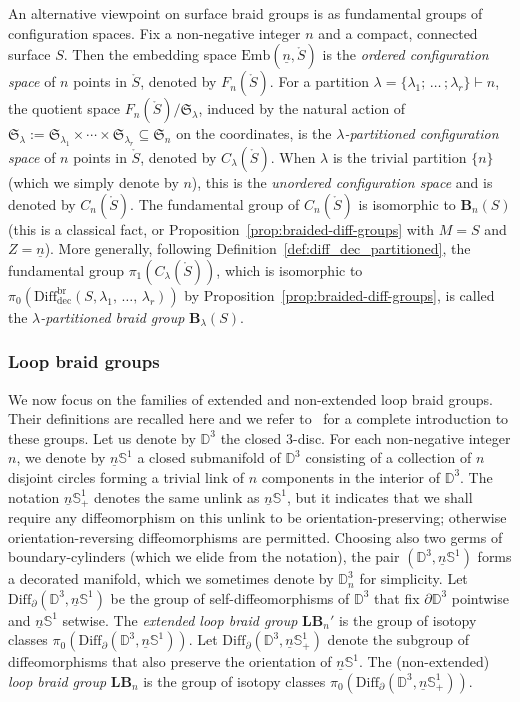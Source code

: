 \documentclass[AHL,Unicode,published]{cedram}
\newcommand{\Emb}{\mathrm{Emb}}
\newcommand{\Diff}{\mathrm{Diff}}
\newcommand{\Int}{\mathring}
\newcommand{\rdec}{\mathrm{dec}}
\newcommand{\B}{\ensuremath{\mathbf{B}}}
\newcommand{\lB}{\mathbf{LB}}
\newcommand{\Sym}{\mathfrak{S}}
\newcommand{\bD}{\mathbb{D}}
\newcommand{\bS}{\mathbb{S}}
\newcommand{\diffdecbr}{\ensuremath{\mathrm{Diff}_{\rdec}^{\mathrm{br}}}}
\begin{document}
An alternative viewpoint on surface braid groups is as fundamental groups of configuration spaces. Fix a non-negative integer $n$ and a compact, connected surface $S$. Then the embedding space $\Emb(\underline{n},\Int{S})$ is the \emph{ordered configuration space} of $n$ points in $\Int{S}$, denoted by $F_n(\Int{S})$. For a partition $\lambda = \boldsymbol{\{} \lambda_{1};\,\ldots\,;\lambda_{r} \boldsymbol{\}} \vdash n$, the quotient space $F_n(\Int{S})/{\Sym_{\lambda}}$, induced by the natural action of $\Sym_{\lambda}:= \Sym_{\lambda_{1}} \times \cdots \times \Sym_{\lambda_{r}} \subseteq \Sym_n$ on the coordinates, is the \emph{$\lambda$-partitioned configuration space} of $n$ points in $\Int{S}$, denoted by $C_{\lambda}(\Int{S})$. When $\lambda$ is the trivial partition $\boldsymbol{\{} n \boldsymbol{\}}$ (which we simply denote by $n$), this is the \emph{unordered configuration space} and is denoted by $C_n(\Int{S})$. The fundamental group of $C_n(\Int{S})$ is isomorphic to $\B_n(S)$ (this is a classical fact, or Proposition~\ref{prop:braided-diff-groups} with $M=S$ and $Z=\underline{n}$). More generally, following Definition~\ref{def:diff_dec_partitioned}, the fundamental group $\pi_{1}(C_\lambda(\Int{S}))$, which is isomorphic to $\pi_{0}(\diffdecbr(S,\lambda_{1},\,\dots,\,\lambda_{r}))$ by Proposition~\ref{prop:braided-diff-groups}, is called the \emph{$\lambda$-partitioned braid group} $\B_{\lambda}(S)$.


\subsubsection{Loop braid groups}\label{sss:category_loop_braid_groups}

We now focus on the families of extended and non-extended loop braid groups. Their definitions are recalled here and we refer to~\cite{Damianijourney} for a complete introduction to these groups. Let us denote by $\bD^{3}$ the closed $3$-disc. For each non-negative integer $n$, we denote by $\underline{n}\bS^{1}$ a closed submanifold of $\bD^{3}$ consisting of a collection of $n$ disjoint circles forming a trivial link of $n$ components in the interior of $\bD^{3}$. The notation $\underline{n}\bS_{+}^{1}$ denotes the same unlink as $\underline{n}\bS^{1}$, but it indicates that we shall require any diffeomorphism on this unlink to be orientation-preserving; otherwise orientation-reversing diffeomorphisms are permitted. Choosing also two germs of boundary-cylinders (which we elide from the notation), the pair $(\ensuremath{\bD^{3}},\underline{n}\bS^{1})$ forms a decorated manifold, which we sometimes denote by $\bD^{3}_{n}$ for simplicity. Let $\Diff_{\partial}(\bD^{3},\underline{n}\bS^{1})$ be the group of self-diffeomorphisms of $\bD^{3}$ that fix $\partial\bD^{3}$ pointwise and $\underline{n}\bS^{1}$ setwise. The \emph{extended loop braid group} $\lB_{n}'$ is the group of isotopy classes $\pi_{0}(\Diff_{\partial}(\bD^{3},\underline{n}\bS^{1}))$. Let $\Diff_{\partial}(\bD^{3},\underline{n}\bS_{+}^{1})$ denote the subgroup of diffeomorphisms that also preserve the orientation of $\underline{n}\bS^{1}$. The (non-extended) \emph{loop braid group} $\lB_{n}$ is the group of isotopy classes $\pi_{0}(\Diff_{\partial}(\bD^{3},\underline{n}\bS_{+}^{1}))$.
\end{document}
